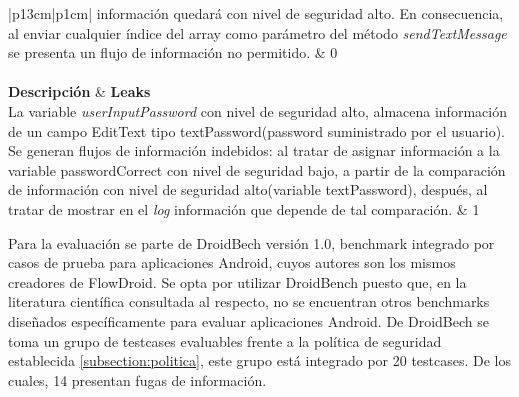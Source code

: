 \begin{table}[t]
\begin{tabular}{|p{13cm}|p{1cm}|}
	información quedará con nivel de seguridad alto. En consecuencia, al enviar
	cualquier índice del array como parámetro del método
	\textit{sendTextMessage} se presenta un flujo de información no
	permitido. & 0
	\\
	\hline
	\\
	\hline
	\textbf{Descripción} & \textbf{Leaks}\\
	\hline
	 La variable \textit{userInputPassword} con nivel de seguridad alto, almacena
	 información de un campo EditText tipo textPassword(password suministrado por
	 el usuario). Se generan flujos de información indebidos: al tratar de asignar
	 información a la variable passwordCorrect con nivel de seguridad bajo, a
	 partir de la comparación de información con nivel de seguridad alto(variable
	 textPassword), después, al tratar de mostrar en el \textit{log} información
	 que depende de tal comparación. & 1\\
	\hline
\end{tabular}
\caption{Aplicaciones de prueba.\newline
Describe parte del conjunto de aplicaciones de prueba. 
}
\label{tab:descripApps0}
\end{table}

Para la evaluación se parte de DroidBech versión 1.0\cite{DroidBenchBenchmarks},
benchmark integrado por casos de prueba para aplicaciones Android, cuyos
autores son los mismos creadores de FlowDroid. Se opta por
utilizar DroidBench puesto que, en la literatura científica consultada al respecto, no se encuentran
otros benchmarks diseñados específicamente para evaluar aplicaciones Android.\newline 
De DroidBech se toma un grupo de testcases evaluables frente a la política de
seguridad establecida \ref{subsection:politica}, este grupo está integrado por
20 testcases. De los cuales, 14 presentan fugas de información.

